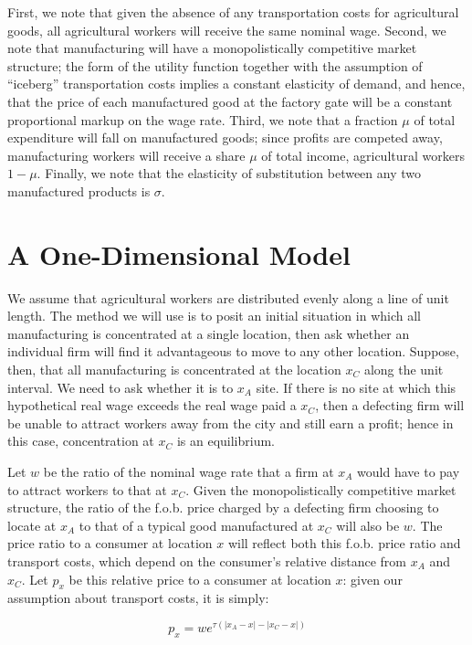 First, we note that given the absence of any transportation costs for agricultural goods, all agricultural workers will receive the same nominal wage. Second, we note that manufacturing will have a monopolistically competitive market structure; the form of the utility function together with the assumption of ``iceberg'' transportation costs implies a constant elasticity of demand, and hence, that the price of each manufactured good at the factory gate will be a constant proportional markup on the wage rate. Third, we note that a fraction $\mu$ of total expenditure will fall on manufactured goods; since profits are competed away, manufacturing workers will receive a share $\mu$ of total income, agricultural workers $1 - \mu$. Finally, we note that the elasticity of substitution between any two manufactured products is $\sigma$.

\section{A One-Dimensional Model}

We assume that agricultural workers are distributed evenly along a line of unit length. The method we will use is to posit an initial situation in which all manufacturing is concentrated at a single location, then ask whether an individual firm will find it advantageous to move to any other location. Suppose, then, that all manufacturing is concentrated at the location $x_C$ along the unit interval. We need to ask whether it is to $x_A$ site. If there is no site at which this hypothetical real wage exceeds the real wage paid a $x_C$, then a defecting firm will be unable to attract workers away from the city and still earn a profit; hence in this case, concentration at $x_C$ is an equilibrium.

Let $w$ be the ratio of the nominal wage rate that a firm at $x_A$ would have to pay to attract workers to that at $x_C$. Given the monopolistically competitive market structure, the ratio of the f.o.b. price charged by a defecting firm choosing to locate at $x_A$ to that of a typical good manufactured at $x_C$ will also be $w$. The price ratio to a consumer at location $x$ will reflect both this f.o.b. price ratio and transport costs, which depend on the consumer's relative distance from $x_A$ and $x_C$. Let $p_x$ be this relative price to a consumer at location $x$: given our assumption about transport costs, it is simply:

\begin{equation}
    p_x = w e^{\tau(|x_A - x| - |x_C - x|)}
\end{equation}

